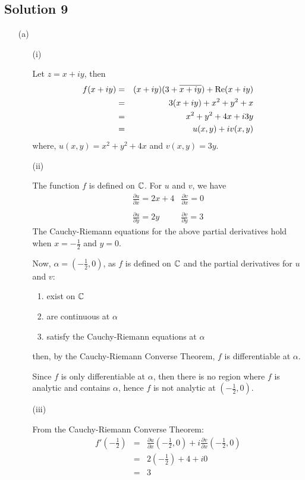 \subsection*{Solution 9}

\begin{itemize}
\item[(a)]

\begin{itemize}
\item[(i)]

Let $z=x+iy$, then
\begin{eqnarray*}
f(x+iy)	&=& (x+iy)(3+\overline{x+iy}) + {\rm Re} (x+iy) \\
	&=& 3(x+iy) + x^2 + y^2 + x \\
	&=& x^2+y^2+4x + i3y \\
	&=& u(x,y) + iv(x,y)
\end{eqnarray*}
where, $u(x,y) = x^2+y^2+4x$ and $v(x,y) = 3y$.

\item[(ii)]

The function $f$ is defined on $\mathbb{C}$. For $u$ and $v$, we have
\[
\begin{array}{ll}
\frac{\partial u}{\partial x} = 2x+4
	& \frac{\partial v}{\partial x} = 0 \\
\\
\frac{\partial u}{\partial y} = 2y
	& \frac{\partial v}{\partial y} = 3
\end{array}
\]
The Cauchy-Riemann equations for the above partial derivatives hold when
$x=-\frac{1}{2}$ and $y=0$.

Now, $\alpha=\left(-\frac{1}{2},0\right)$, as $f$ is defined on $\mathbb{C}$ and the
partial derivatives for $u$ and $v$:
\begin{enumerate}
\item exist on $\mathbb{C}$
\item are continuous at $\alpha$
\item satisfy the Cauchy-Riemann equations at $\alpha$
\end{enumerate}
then, by the Cauchy-Riemann Converse Theorem, $f$ is
differentiable at $\alpha$.

Since $f$ is only differentiable at $\alpha$, then there is no region
where $f$ is analytic and contains $\alpha$, hence $f$ is not analytic
at $\left(-\frac{1}{2},0\right)$.

\item[(iii)]

From the Cauchy-Riemann Converse Theorem:
\begin{eqnarray*}
f'\left(-\frac{1}{2}\right)
	&=& \frac{\partial u}{\partial x}\left(-\frac{1}{2},0\right)
		+ i\frac{\partial v}{\partial x}\left(-\frac{1}{2},0\right) \\
	&=& 2\left(-\frac{1}{2}\right) + 4 + i0 \\
	&=& 3
\end{eqnarray*}


\end{itemize}
\end{itemize}
